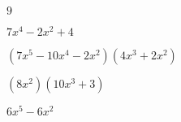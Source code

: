 \documentclass{article}
\begin{document}
\begin{multicols}{2}
$9$\item $7x^{4}-2x^2+4$\item $(7x^{5}-10x^{4}-2x^2)(4x^{3}+2x^2)$\item $(8x^2)(10x^{3}+3)$\item $6x^{5}-6x^2$\item
\end{multicols}
\end{document}
